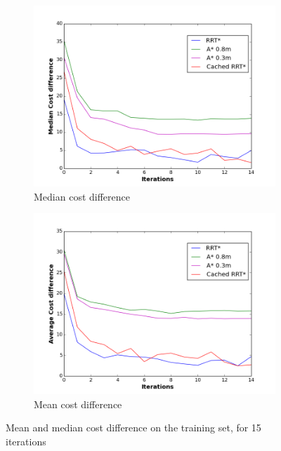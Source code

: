 \documentclass{article}  %
\begin{document}
\begin{figure}[tbh]
	\centering
      \hspace{-5mm}
      \begin{subfigure}[b]{0.455\columnwidth}

    \includegraphics[clip=true,width=1.25\textwidth]{images/cost_diff_med.png}
    \caption{Median cost difference}
    \label{fig:train_cd_med}
  \end{subfigure}
 \hspace{5mm}
  \begin{subfigure}[b]{0.455\columnwidth}
    \includegraphics[clip=true,width=1.25\textwidth]{images/cost_diff.png}
    \caption{Mean cost difference}
    \label{fig:train_cd_mean}
  \end{subfigure} 

  \caption{Mean and median cost difference on the training set, for 15 iterations}
  \label{fig:train_results}

\end{figure}
\end{document}
